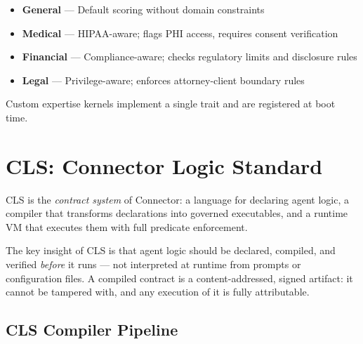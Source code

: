 \begin{itemize}[leftmargin=1.5em, itemsep=2pt]
  \item \textbf{General} — Default scoring without domain constraints
  \item \textbf{Medical} — HIPAA-aware; flags PHI access, requires consent verification
  \item \textbf{Financial} — Compliance-aware; checks regulatory limits and disclosure rules
  \item \textbf{Legal} — Privilege-aware; enforces attorney-client boundary rules
\end{itemize}

Custom expertise kernels implement a single trait and are registered at boot time.

\section{CLS: Connector Logic Standard}

CLS is the \emph{contract system} of Connector: a language for declaring agent
logic, a compiler that transforms declarations into governed executables, and a
runtime VM that executes them with full predicate enforcement.

The key insight of CLS is that agent logic should be declared, compiled, and
verified \emph{before} it runs — not interpreted at runtime from prompts or
configuration files. A compiled contract is a content-addressed, signed
artifact: it cannot be tampered with, and any execution of it is fully
attributable.

\subsection{CLS Compiler Pipeline}

